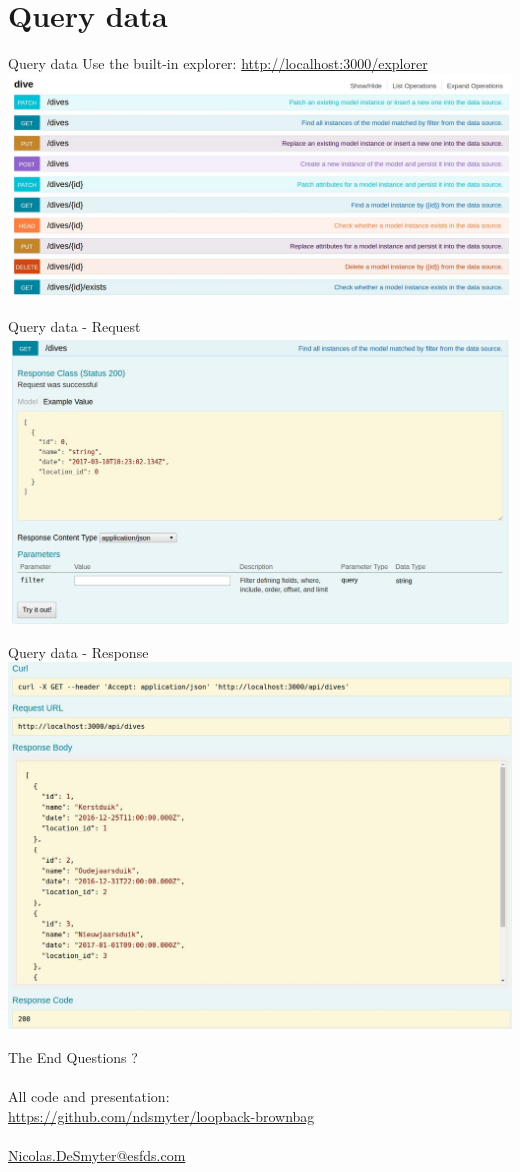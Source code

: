 \documentclass[11pt]{beamer}
\begin{document}
\section{Query data}
\begin{frame}{Query data}
Use the built-in explorer: \url{http://localhost:3000/explorer}\\
\includegraphics[width=\textwidth]{images/explorer-overview.jpg} 
\end{frame}

\begin{frame}{Query data - Request}
\includegraphics[width=\textwidth]{images/explorer-request.jpg} 
\end{frame}

\begin{frame}{Query data - Response}
\includegraphics[width=\textwidth]{images/explorer-response.jpg} 
\end{frame}

\begin{frame}{The End}
Questions ?\\
~\\
All code and presentation:\\
\url{https://github.com/ndsmyter/loopback-brownbag}\\
~\\
\hyperref[mailto:Nicolas.DeSmyter@esfds.com]{Nicolas.DeSmyter@esfds.com}
\end{frame}
\end{document}
